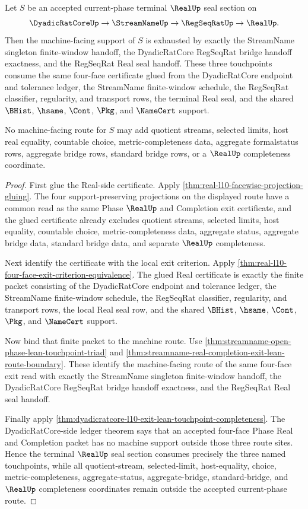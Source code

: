 \begin{theorem}
\label{thm:real-terminal-seal-machine-route-exhaustion}
Let $S$ be an accepted current-phase terminal $\RealUp$ seal section on
$$
\DyadicRatCoreUp \to \StreamNameUp \to \RegSeqRatUp \to \RealUp .
$$
Then the machine-facing support of $S$ is exhausted by exactly the StreamName singleton finite-window handoff, the DyadicRatCore RegSeqRat bridge handoff exactness, and the RegSeqRat Real seal handoff. These three touchpoints consume the same four-face certificate glued from the DyadicRatCore endpoint and tolerance ledger, the StreamName finite-window schedule, the RegSeqRat classifier, regularity, and transport rows, the terminal Real seal, and the shared $\BHist$, $\hsame$, $\Cont$, $\Pkg$, and $\NameCert$ support.

No machine-facing route for $S$ may add quotient streams, selected limits, host real equality, countable choice, metric-completeness data, aggregate formalstatus rows, aggregate bridge rows, standard bridge rows, or a $\RealUp$ completeness coordinate.
\end{theorem}
\begin{proof}
First glue the Real-side certificate. Apply \autoref{thm:real-l10-facewise-projection-gluing}. The four support-preserving projections on the displayed route have a common read as the same Phase $\RealUp$ and Completion exit certificate, and the glued certificate already excludes quotient streams, selected limits, host equality, countable choice, metric-completeness data, aggregate status, aggregate bridge data, standard bridge data, and separate $\RealUp$ completeness.

Next identify the certificate with the local exit criterion. Apply \autoref{thm:real-l10-four-face-exit-criterion-equivalence}. The glued Real certificate is exactly the finite packet consisting of the DyadicRatCore endpoint and tolerance ledger, the StreamName finite-window schedule, the RegSeqRat classifier, regularity, and transport rows, the local Real seal row, and the shared $\BHist$, $\hsame$, $\Cont$, $\Pkg$, and $\NameCert$ support.

Now bind that finite packet to the machine route. Use \autoref{thm:streamname-open-phase-lean-touchpoint-triad} and \autoref{thm:streamname-real-completion-exit-lean-route-boundary}. These identify the machine-facing route of the same four-face exit read with exactly the StreamName singleton finite-window handoff, the DyadicRatCore RegSeqRat bridge handoff exactness, and the RegSeqRat Real seal handoff.

Finally apply \autoref{thm:dyadicratcore-l10-exit-lean-touchpoint-completeness}. The DyadicRatCore-side ledger theorem says that an accepted four-face Phase Real and Completion packet has no machine support outside those three route sites. Hence the terminal $\RealUp$ seal section consumes precisely the three named touchpoints, while all quotient-stream, selected-limit, host-equality, choice, metric-completeness, aggregate-status, aggregate-bridge, standard-bridge, and $\RealUp$ completeness coordinates remain outside the accepted current-phase route.
\end{proof}

